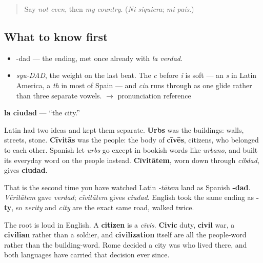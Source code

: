 \label{lesson:ES-C325-ciudad}



\begin{quote}
Say \emph{not even}, then \emph{my country}. (\emph{Ni siquiera}; \emph{mi país}.)
\end{quote}

\subsection*{What to know first}
\begin{itemize}
\raggedright
  \item -dad — the ending, met once already with \emph{la verdad}.
\end{itemize}

\begin{sounds}
\begin{itemize}
\raggedright
  \item \emph{syu-DAD}, the weight on the last beat. The \emph{c} before \emph{i} is soft — an \emph{s} in Latin America, a \emph{th} in most of Spain — and \emph{ciu} runs through as one glide rather than three separate vowels. $\to$ pronunciation reference
\end{itemize}
\end{sounds}

\begin{cousinweb}
\textbf{la ciudad} — \textquotedblleft{}the city.\textquotedblright{}

Latin had two ideas and kept them separate. \textbf{Urbs} was the buildings: walls, streets, stone. \textbf{Cīvitās} was the people: the body of \textbf{cīvēs}, citizens, who belonged to each other. Spanish let \emph{urbs} go except in bookish words like \emph{urbano}, and built its everyday word on the people instead. \textbf{Cīvitātem}, worn down through \emph{cibdad}, gives \textbf{ciudad}.

That is the second time you have watched Latin \emph{-tātem} land as Spanish \textbf{-dad}. \emph{Vēritātem} gave \emph{verdad}; \emph{cīvitātem} gives \emph{ciudad}. English took the same ending as \textbf{-ty}, so \emph{verity} and \emph{city} are the exact same road, walked twice.

The root is loud in English. A \textbf{citizen} is a \emph{cīvis}. \textbf{Civic} duty, \textbf{civil} war, a \textbf{civilian} rather than a soldier, and \textbf{civilization} itself are all the people-word rather than the building-word. Rome decided a city was who lived there, and both languages have carried that decision ever since.
\end{cousinweb}


